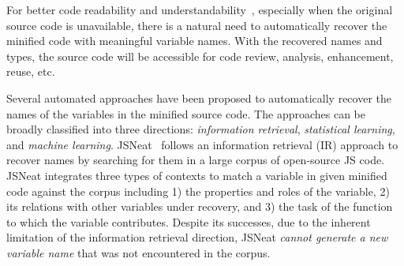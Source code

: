 %
%

For better code readability and
understandability~\cite{barr-codeconvention-fse14}, especially when
the original source code is unavailable, there is a natural need to
automatically recover the minified code with meaningful variable
names. With the recovered names and types, the source code will be
accessible for
code review, analysis, enhancement, reuse, etc.




Several automated approaches have been proposed to automatically
recover the names of the variables in the minified source code.  The
approaches can be broadly classified into three directions: {\em
  information retrieval}, {\em statistical learning}, and {\em machine
  learning}.  JSNeat~\cite{icse19} follows an information retrieval
(IR) approach to recover names by searching for them in a large corpus
of open-source JS code. JSNeat integrates three types of contexts to
match a variable in given minified code against the corpus including
1) the properties and roles of the variable, 2)
its relations with other variables under
recovery, and 3)
the task of the function to which the variable contributes.  Despite
its successes, due to the inherent limitation of the information
retrieval direction, JSNeat {\em cannot generate a new variable name}
that was not encountered in the corpus.

